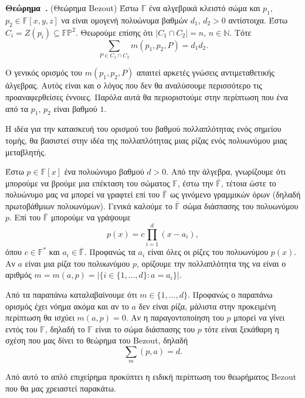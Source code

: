 \documentclass[12pt, a4paper]{book}
\newcounter{theorem}[section]
\newenvironment{theorem}[1][]{\refstepcounter{theorem}\par\medskip
   \textbf{Θεώρημα~\thetheorem. #1} \rmfamily}{\medskip}
\begin{document}
\begin{theorem} (Θεώρημα \textlatin{Bezout})
Έστω $\mathbb{F}$ ένα αλγεβρικά κλειστό σώμα και $p_1$, $p_2 \in \mathbb{F}[x,y,z]$ να είναι ομογενή πολυώνυμα βαθμών $d_1$, $d_2 >0$ αντίστοιχα. Έστω $C_i = Z(p_i) \subseteq \mathbb{F}\mathbb{P}^2$. Θεωρούμε επίσης ότι $|C_1 \cap C_2 | = n$, $n \in \mathbb{N}$. Τότε
\begin{displaymath}
\sum_{P \in C_1 \cap C_2}m(p_1,p_2,P)=d_1d_2.
\end{displaymath}
\end{theorem}

Ο γενικός ορισμός του $m(p_1,p_2,P)$ απαιτεί αρκετές γνώσεις αντιμεταθετικής άλγεβρας. Αυτός είναι και ο λόγος που δεν θα αναλύσουμε περισσότερο τις προαναφερθείσες έννοιες. Παρόλα αυτά θα περιοριστούμε στην περίπτωση που ένα από τα  $p_1$, $p_2$  είναι βαθμού $1$.

Η ιδέα για την κατασκευή του ορισμού του βαθμού πολλαπλότητας ενός σημείου τομής, θα βασιστεί στην ιδέα της πολλαπλότητας μιας ρίζας ενός πολυωνύμου μιας μεταβλητής. 


Έστω $p \in \mathbb{F}[x]$ ένα πολυώνυμο βαθμού $d > 0$. Από την άλγεβρα, γνωρίζουμε ότι μπορούμε να βρούμε μια επέκταση του σώματος $\mathbb{F}$, έστω την $\mathbb{\bar{F}}$, τέτοια ώστε το πολυώνυμο μας να μπορεί να γραφτεί επί του $\mathbb{\bar{F}}$ ως γινόμενο γραμμικών όρων (δηλαδή πρωτοβάθμιων πολυωνύμων). Γενικά καλούμε το $\mathbb{\bar{F}}$ σώμα διάσπασης του πολυωνύμου $p$. Επί του $\mathbb{\bar{F}}$ μπορούμε να γράψουμε
\begin{displaymath}
p(x)=c \prod_{i=1}^d(x-a_i),
\end{displaymath}
όπου $c \in \mathbb{F}^*$ και $a_i \in \mathbb{\bar{F}}$. Προφανώς τα $a_i$ είναι όλες οι ρίζες του πολυωνύμου $p(x)$. Αν $a$ είναι μια ρίζα του πολυωνύμου $p$, ορίζουμε την πολλαπλότητα της να είναι ο αριθμός $m=m(a,p) = |\{i \in \{1,…,d\}:a=a_i\}|$.

Από τα παραπάνω καταλαβαίνουμε ότι $m \in \{1,…,d\}$. Προφανώς ο παραπάνω ορισμός έχει νόημα ακόμα και αν το $a$ δεν είναι ρίζα, μάλιστα στην προκειμένη περίπτωση θα ισχύει $m(a,p)=0$. Αν η παραγοντοποίηση του $p$ μπορεί να γίνει εντός του $\mathbb{F}$, δηλαδή το $\mathbb{F}$ είναι το σώμα διάσπασης του $p$ τότε είναι ξεκάθαρη η σχέση που μας δίνει το θεώρημα του \textlatin{Bezout}, δηλαδή
\begin{displaymath}
 \sum_m(p,a)=d.
\end{displaymath}

Από αυτό το απλό επιχείρημα προκύπτει η ειδική περίπτωση του θεωρήματος \textlatin{Bezout} που θα μας χρειαστεί παρακάτω.
\end{document}
